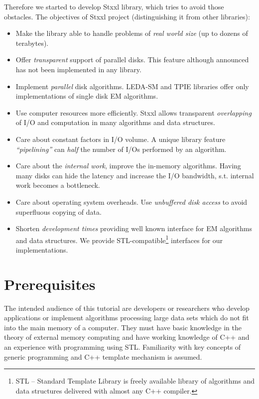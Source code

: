 \documentclass[twoside]{book}
\newcommand{\stxxl}{{\sc Stxxl} }
\begin{document}
Therefore we started to develop \stxxl library, which tries to avoid
those obstacles. The objectives of \stxxl project (distinguishing
it from other libraries): 
\begin{itemize}
\item Make the library able to handle problems of \emph{real world size}
(up to dozens of terabytes). 

\item Offer \emph{transparent} support of parallel disks. This feature
although announced has not been implemented in any library.
\item Implement \emph{parallel} disk algorithms. LEDA-SM and TPIE
libraries offer only implementations of single disk EM algorithms.
\item Use computer resources more efficiently. \stxxl allows 
transparent \emph{overlapping} of I/O and computation in many algorithms and
data structures.
\item Care about constant factors in I/O volume. A unique library
feature \emph{``pipelining''} can \emph{half} the number of I/Os
performed by an algorithm.
\item Care about the \emph{internal work}, improve the in-memory
algorithms. Having many disks can hide the latency and increase the
I/O bandwidth, s.t. internal work becomes a bottleneck.
\item Care about operating system overheads. Use \emph{unbuffered disk
access} to avoid superfluous copying of data.
\item Shorten \emph{development times} providing well known interface for EM
algorithms and data structures. We provide STL-compatible\footnote{STL
-- Standard Template Library \cite{stepanov94standard} is freely available library of
algorithms and data structures delivered with almost any C++
compiler.} interfaces for our implementations.
\end{itemize}

\chapter{Prerequisites}

The intended audience of this tutorial are developers or researchers who
develop applications or implement algorithms processing large data sets
which do not fit into the main memory of a computer. They must have
basic knowledge in the theory of external memory computing and 
have working knowledge of C++ and an experience with programming using
STL. Familiarity with key concepts of generic programming and
C++ template mechanism is assumed.
\end{document}
